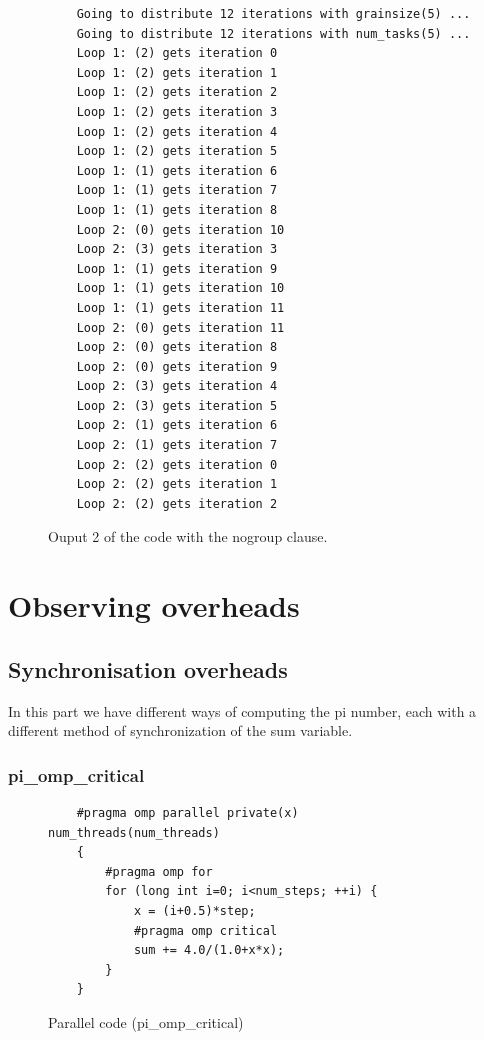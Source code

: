 \documentclass[12pt, a4paper]{article}
\begin{document}
\begin{figure}[H]
	\begin{lstlisting}
	Going to distribute 12 iterations with grainsize(5) ...
	Going to distribute 12 iterations with num_tasks(5) ...
	Loop 1: (2) gets iteration 0
	Loop 1: (2) gets iteration 1
	Loop 1: (2) gets iteration 2
	Loop 1: (2) gets iteration 3
	Loop 1: (2) gets iteration 4
	Loop 1: (2) gets iteration 5
	Loop 1: (1) gets iteration 6
	Loop 1: (1) gets iteration 7
	Loop 1: (1) gets iteration 8
	Loop 2: (0) gets iteration 10
	Loop 2: (3) gets iteration 3
	Loop 1: (1) gets iteration 9
	Loop 1: (1) gets iteration 10
	Loop 1: (1) gets iteration 11
	Loop 2: (0) gets iteration 11
	Loop 2: (0) gets iteration 8
	Loop 2: (0) gets iteration 9
	Loop 2: (3) gets iteration 4
	Loop 2: (3) gets iteration 5
	Loop 2: (1) gets iteration 6
	Loop 2: (1) gets iteration 7
	Loop 2: (2) gets iteration 0
	Loop 2: (2) gets iteration 1
	Loop 2: (2) gets iteration 2
	\end{lstlisting}
	
	\caption{Ouput 2 of the code with the nogroup clause.}
	\label{Ouput 2 of the code with the nogroup clause.}
\end{figure}

\section{Observing overheads}

\subsection{Synchronisation overheads}

In this part we have different ways of computing the pi number, each with a different method of synchronization of the sum variable.

\subsubsection{pi\_omp\_critical}

\begin{figure}[H]
	\begin{lstlisting}
	#pragma omp parallel private(x) num_threads(num_threads)
    {
        #pragma omp for 
        for (long int i=0; i<num_steps; ++i) {
            x = (i+0.5)*step;
            #pragma omp critical 
	    	sum += 4.0/(1.0+x*x);
        }
    }
	\end{lstlisting}
	
	\caption{Parallel code (pi\_omp\_critical)}
\end{figure}
\end{document}
